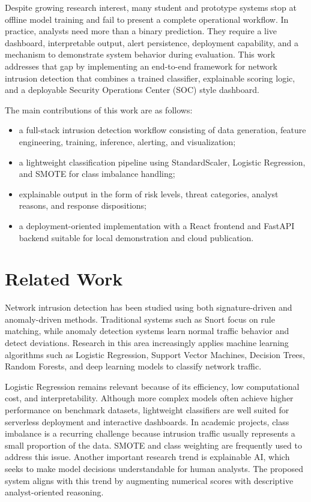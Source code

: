 \documentclass[conference]{IEEEtran}
\begin{document}
Despite growing research interest, many student and prototype systems stop at offline model training and fail to present a complete operational workflow. In practice, analysts need more than a binary prediction. They require a live dashboard, interpretable output, alert persistence, deployment capability, and a mechanism to demonstrate system behavior during evaluation. This work addresses that gap by implementing an end-to-end framework for network intrusion detection that combines a trained classifier, explainable scoring logic, and a deployable Security Operations Center (SOC) style dashboard.

The main contributions of this work are as follows:
\begin{itemize}
\item a full-stack intrusion detection workflow consisting of data generation, feature engineering, training, inference, alerting, and visualization;
\item a lightweight classification pipeline using StandardScaler, Logistic Regression, and SMOTE for class imbalance handling;
\item explainable output in the form of risk levels, threat categories, analyst reasons, and response dispositions;
\item a deployment-oriented implementation with a React frontend and FastAPI backend suitable for local demonstration and cloud publication.
\end{itemize}

\section{Related Work}
Network intrusion detection has been studied using both signature-driven and anomaly-driven methods. Traditional systems such as Snort focus on rule matching, while anomaly detection systems learn normal traffic behavior and detect deviations. Research in this area increasingly applies machine learning algorithms such as Logistic Regression, Support Vector Machines, Decision Trees, Random Forests, and deep learning models to classify network traffic.

Logistic Regression remains relevant because of its efficiency, low computational cost, and interpretability. Although more complex models often achieve higher performance on benchmark datasets, lightweight classifiers are well suited for serverless deployment and interactive dashboards. In academic projects, class imbalance is a recurring challenge because intrusion traffic usually represents a small proportion of the data. SMOTE and class weighting are frequently used to address this issue. Another important research trend is explainable AI, which seeks to make model decisions understandable for human analysts. The proposed system aligns with this trend by augmenting numerical scores with descriptive analyst-oriented reasoning.
\end{document}
